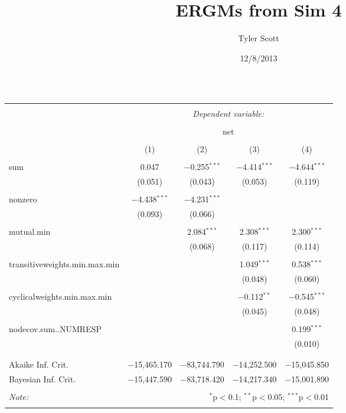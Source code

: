 \documentclass{article}
\title{ERGMs from Sim 4}
\author{Tyler Scott}
\date{12/8/2013}
\begin{document}
\begin{table}[!htbp] \centering 
  \caption{} 
  \label{} 
\begin{tabular}{@{\extracolsep{5pt}}lcccc} 
\\[-1.8ex]\hline 
\hline \\[-1.8ex] 
 & \multicolumn{4}{c}{\textit{Dependent variable:}} \\ 
\cline{2-5} 
\\[-1.8ex] & \multicolumn{4}{c}{net} \\ 
\\[-1.8ex] & (1) & (2) & (3) & (4)\\ 
\hline \\[-1.8ex] 
 sum & 0.047 & $-$0.255$^{***}$ & $-$4.414$^{***}$ & $-$4.644$^{***}$ \\ 
  & (0.051) & (0.043) & (0.053) & (0.119) \\ 
  & & & & \\ 
 nonzero & $-$4.438$^{***}$ & $-$4.231$^{***}$ &  &  \\ 
  & (0.093) & (0.066) &  &  \\ 
  & & & & \\ 
 mutual.min &  & 2.084$^{***}$ & 2.308$^{***}$ & 2.300$^{***}$ \\ 
  &  & (0.068) & (0.117) & (0.114) \\ 
  & & & & \\ 
 transitiveweights.min.max.min &  &  & 1.049$^{***}$ & 0.538$^{***}$ \\ 
  &  &  & (0.048) & (0.060) \\ 
  & & & & \\ 
 cyclicalweights.min.max.min &  &  & $-$0.112$^{**}$ & $-$0.545$^{***}$ \\ 
  &  &  & (0.045) & (0.048) \\ 
  & & & & \\ 
 nodecov.sum..NUMRESP &  &  &  & 0.199$^{***}$ \\ 
  &  &  &  & (0.010) \\ 
  & & & & \\ 
\hline \\[-1.8ex] 
Akaike Inf. Crit. & $-$15,465.170 & $-$83,744.790 & $-$14,252.500 & $-$15,045.850 \\ 
Bayesian Inf. Crit. & $-$15,447.590 & $-$83,718.420 & $-$14,217.340 & $-$15,001.890 \\ 
\hline 
\hline \\[-1.8ex] 
\textit{Note:}  & \multicolumn{4}{r}{$^{*}$p$<$0.1; $^{**}$p$<$0.05; $^{***}$p$<$0.01} \\ 
\normalsize 
\end{tabular} 
\end{table} 
\end{document}
